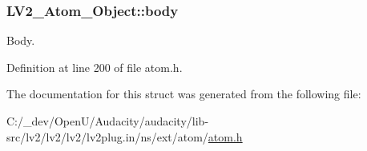 \subsubsection[{\texorpdfstring{body}{body}}]{ L\+V2\+\_\+\+Atom\+\_\+\+Object\+::body}\hypertarget{struct_l_v2___atom___object_a660e9f36b7bdf33e8d054b5b573d8fdb}{}\label{struct_l_v2___atom___object_a660e9f36b7bdf33e8d054b5b573d8fdb}
Body. 

Definition at line 200 of file atom.\+h.



The documentation for this struct was generated from the following file\+:\begin{DoxyCompactItemize}
\item 
C\+:/\+\_\+dev/\+Open\+U/\+Audacity/audacity/lib-\/src/lv2/lv2/lv2/lv2plug.\+in/ns/ext/atom/\hyperlink{atom_8h}{atom.\+h}\end{DoxyCompactItemize}
